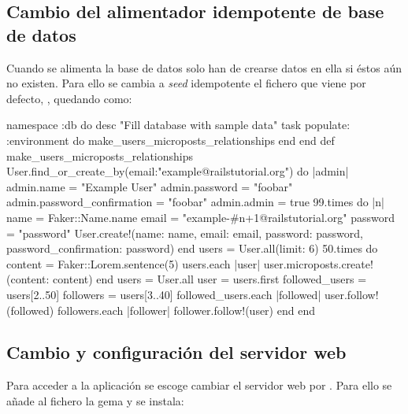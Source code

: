 \subsection{Cambio del alimentador idempotente de base de datos}

Cuando se alimenta la base de datos solo han de crearse datos en ella si éstos aún no existen. Para ello se cambia a \textit{seed} idempotente el fichero que viene por defecto, , quedando como:

\begin{codelisting}
\label{code:idempotentseed}
\begin{code}
namespace :db do
  desc "Fill database with sample data"
  task populate: :environment do
    make_users_microposts_relationships
  end
end
def make_users_microposts_relationships
  User.find_or_create_by(email:"example@railstutorial.org") do |admin|
  	admin.name = "Example User"
	admin.password = "foobar"
        admin.password_confirmation = "foobar"
        admin.admin = true
	99.times do |n|
	    name  = Faker::Name.name
	    email = "example-#{n+1}@railstutorial.org"
	    password  = "password"
	    User.create!(name:     name,
                 email:    email,
                 password: password,
                 password_confirmation: password)
        end
	users = User.all(limit: 6)
  	50.times do
	    content = Faker::Lorem.sentence(5)
	    users.each { |user| user.microposts.create!(content: content) }
	end  
	users = User.all
	user  = users.first
	followed_users = users[2..50]
	followers      = users[3..40]
	followed_users.each { |followed| user.follow!(followed) }
	followers.each      { |follower| follower.follow!(user) }
  end
end
\end{code}
\end{codelisting}

\subsection{Cambio y configuración del servidor web}

Para acceder a la aplicación se escoge cambiar el servidor web  por . Para ello se añade al fichero  la gema  y se instala: 


